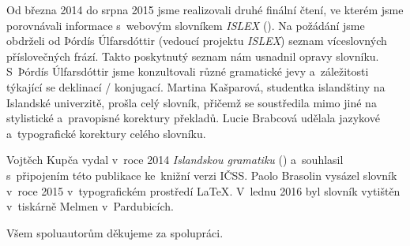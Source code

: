 Od března 2014 do srpna 2015 jsme realizovali druhé finální čtení, ve kterém jsme porovnávali informace s~webovým slovníkem \textit{ISLEX} (\cite {int1}). 
Na požádání jsme obdrželi od Þórdís Úlfarsdóttir (vedoucí projektu \textit{ISLEX}) seznam víceslovných příslovečných frází. Takto poskytnutý seznam nám usnadnil opravy slovníku. 
S~Þórdís Úlfarsdóttir jsme konzultovali různé gramatické jevy a~záležitosti týkající se deklinací / konjugací.
Martina Kašparová, studentka islandštiny na Islandské univerzitě, prošla celý slovník, přičemž se soustředila mimo jiné na stylistické a~pravopisné korektury překladů. 
Lucie Brabcová udělala jazykové a~typografické korektury celého slovníku.

Vojtěch Kupča vydal v~roce 2014 \textit{Islandskou gramatiku} (\cite {is77}) a~souhlasil s~připojením této publikace ke~knižní verzi IČSS.
Paolo Brasolin vysázel slovník v~roce 2015 v~typografickém prostředí {\LaTeX}. V~lednu 2016 byl slovník vytištěn v~tiskárně Melmen v~Pardubicích.

\blspace[5]

{\centering Všem spoluautorům děkujeme za spolupráci.\par}
